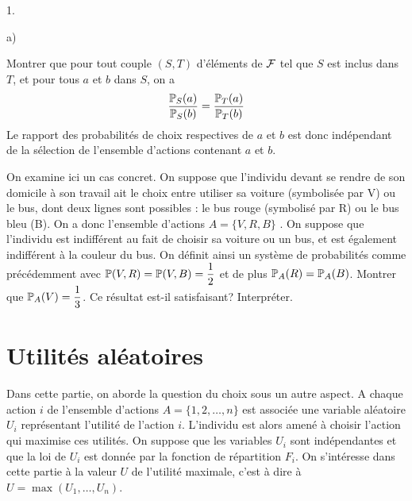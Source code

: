 \documentclass[11pt]{article}%
\begin{document}
\begin{noliste}{1.}
  \item 
  \begin{noliste}{a)}
    \item Montrer que pour tout couple $(S,T)$ 
    d'éléments de ${\cal F}$ tel que $S$ est inclus dans $T$,  et pour 
    tous $a$ et $b$ dans $S$, on a 
    \[
     \dfrac{\mathbb{P}_S(a)}{\mathbb{P}_S(b)} = \dfrac{\mathbb{P}_T(a)}{\mathbb{P}_T(b)}
    \]
    Le rapport des probabilités de choix respectives de $a$ et $b$ est 
    donc indépendant de la sélection de l'ensemble d'actions contenant 
    $a$ et $b$.
    
    \item On examine ici un cas concret. On suppose que l'individu 
    devant se rendre de son domicile à son travail ait le choix entre 
    utiliser sa voiture (symbolisée par V) ou le bus, dont deux lignes 
    sont possibles : le bus rouge (symbolisé par R) ou le bus bleu (B). 
    On a donc l'ensemble d'actions $A=\{ V,R,B \}$ . On suppose que 
    l'individu est indifférent au fait de choisir sa voiture ou un bus, 
    et est également indifférent à la couleur du bus. On définit ainsi 
    un système de probabilités comme précédemment avec  
    $\mathbb{P}(V,R)=\mathbb{P}(V,B)=\dfrac{1}{2}$ et de plus 
    $\mathbb{P}_A(R)=\mathbb{P}_A(B)$. 
    Montrer que $\mathbb{P}_A(V)=\dfrac{1}{3}$. Ce résultat est-il 
    satisfaisant? 
    Interpréter.
  \end{noliste}
\end{noliste}








\section{Utilités aléatoires}

\noindent
Dans cette partie, on aborde la question du choix sous un autre aspect. 
A chaque action $i$ de l'ensemble d'actions $A =\{ 1,2, \dots , n\} $ 
est associée une variable aléatoire $U_i$ représentant l'utilité 
de l'action $i$. L'individu est alors amené à choisir l'action qui 
maximise ces utilités. On suppose que les variables $U_i$ sont 
indépendantes et que la loi de $U_i$ est donnée par la fonction de 
répartition $F_i$. On s'intéresse dans cette partie à la valeur 
$U$ de l'utilité maximale, c'est à dire à $U=\max (U_1,\dots , 
U_n)$.
\end{document}
